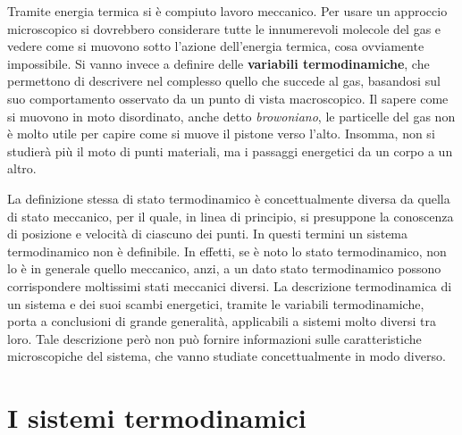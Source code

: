 \documentclass[10pt,a4paper]{book}
\begin{document}
\FloatBarrier
Tramite energia termica si è compiuto lavoro meccanico. Per usare un approccio microscopico si dovrebbero considerare tutte le innumerevoli molecole del gas e vedere come si muovono sotto l'azione dell'energia termica, cosa ovviamente impossibile. Si vanno invece a definire delle \textbf{variabili termodinamiche}, che permettono di descrivere nel complesso quello che succede al gas, basandosi sul suo comportamento osservato da un punto di vista macroscopico. Il sapere come si muovono in moto disordinato, anche detto \emph{browoniano}, le particelle del gas non è molto utile per capire come si muove il pistone verso l'alto. Insomma, non si studierà più il moto di punti materiali, ma i passaggi energetici da un corpo a un altro.

La definizione stessa di stato termodinamico è concettualmente diversa da quella di stato meccanico, per il quale, in linea di principio, si presuppone la conoscenza di posizione e velocità di ciascuno dei punti. In questi termini un sistema termodinamico non è definibile. In effetti, se è noto lo stato termodinamico, non lo è in generale quello meccanico, anzi, a un dato stato termodinamico possono corrispondere moltissimi stati meccanici diversi. La descrizione termodinamica di un sistema e dei suoi scambi energetici, tramite le variabili termodinamiche, porta a conclusioni di grande generalità, applicabili a sistemi molto diversi tra loro. Tale descrizione però non può fornire informazioni sulle caratteristiche microscopiche del sistema, che vanno studiate concettualmente in modo diverso.







































\section{I sistemi termodinamici}
\end{document}
